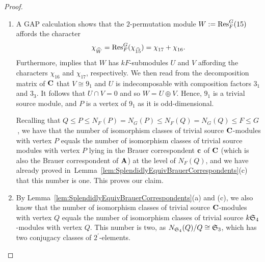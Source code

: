 \begin{proof}
\begin{enumerate}[label={\rm(\alph*)}] 
    \item 
    A GAP calculation \cite{GAP} shows that the $2$-permutation module $W:=\operatorname{Res}^{G}_{F}(15)$ affords the character 
    \[
        \chi^{}_{\widehat{{W}}}=\operatorname{Res}^{G}_{F}(\chi^{}_{\widehat{15}})=\chi^{}_{17}+\chi^{}_{16}.
    \]
Furthermore, \cite[I, 
Theorem 17.3]{LandrockBook} implies that $W$ has $kF$-submodules $U$ and $V$ affording the characters $\chi^{}_{16}$ and $\chi^{}_{17}$, respectively.  We then read from the decomposition matrix of ${\mathbf{C}}$ that $V\cong 9_1$ and $U$ is indecomposable with composition factors $3_1$ and $3_3$. It follows that $U\cap V=0$ and so $W=U\oplus V$.  
Hence, $9_1$ is a trivial source module, and $P$ is a vertex of $9_1$ as it is odd-dimensional.
\par
    Recalling that 
    $Q\leq P\leq N_F(P)=N_{G}(P)\leq N_F(Q)=N_{G}(Q)\leq F\leq G$\,, we have that 
     the number of isomorphism classes of trivial source ${\mathbf{C}}$-modules with vertex $P$ equals the number of isomorphism classes of trivial source modules with vertex $P$ lying in the Brauer correspondent ${\mathbf{c}}$ of ${\mathbf{C}}$ (which is also the Brauer correspondent of ${\mathbf{A}}$) at the level of $N_F(Q)$, and we have already proved in~Lemma~\ref{lem:SplendidlyEquivBrauerCorrespondents}(c) that this number is one. This proves our claim.
    \item By Lemma~\ref{lem:SplendidlyEquivBrauerCorrespondents}(a) and (c), we also know that the number of isomorphism classes of trivial source ${\mathbf{C}}$-modules with vertex $Q$ equals the number of isomorphism classes of trivial source $k{\mathfrak{S}}_4$-modules with vertex $Q$. This number is  two, as $N_{{\mathfrak{S}}_4}(Q)/Q\cong {\mathfrak{S}}_3$, which has two conjugacy classes of $2^\prime$-elements.
    \par
   

\end{enumerate}
\end{proof}
